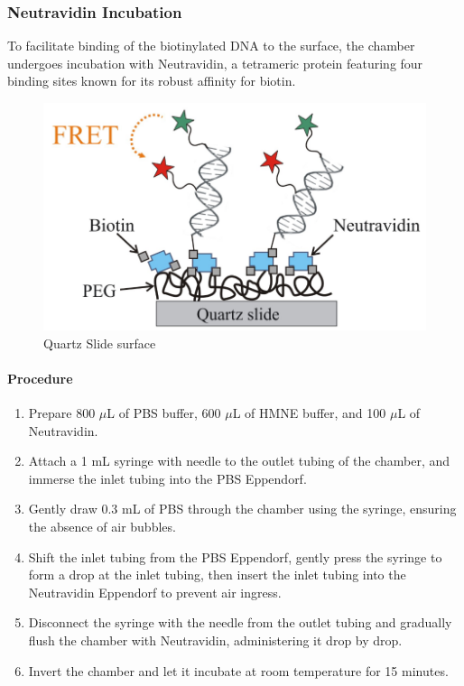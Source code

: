 \documentclass[a4paper,english,12pt,bibliography=totoc]{scrreprt}
\begin{document}
\subsubsection{Neutravidin Incubation}

To facilitate binding of the biotinylated DNA to the surface, the chamber undergoes incubation with Neutravidin, a tetrameric protein featuring four binding sites known for its robust affinity for biotin.


\begin{figure} [H]
    \centering
    \includegraphics[width=0.8\linewidth]{images/quartslide.png}
    \caption{Quartz Slide surface}
    \label{fig:enter-label}
\end{figure}

\paragraph{Procedure}

\begin{enumerate}
    \item Prepare 800 $\mu$L of PBS buffer, 600 $\mu$L of HMNE buffer, and 100 $\mu$L of Neutravidin.
    \item Attach a 1 mL syringe with needle to the outlet tubing of the chamber, and immerse the inlet tubing into the PBS Eppendorf.
    \item Gently draw 0.3 mL of PBS through the chamber using the syringe, ensuring the absence of air bubbles.
    \item Shift the inlet tubing from the PBS Eppendorf, gently press the syringe to form a drop at the inlet tubing, then insert the inlet tubing into the Neutravidin Eppendorf to prevent air ingress.
    \item Disconnect the syringe with the needle from the outlet tubing and gradually flush the chamber with Neutravidin, administering it drop by drop.
    \item Invert the chamber and let it incubate at room temperature for 15 minutes.
\end{enumerate}
\end{document}
